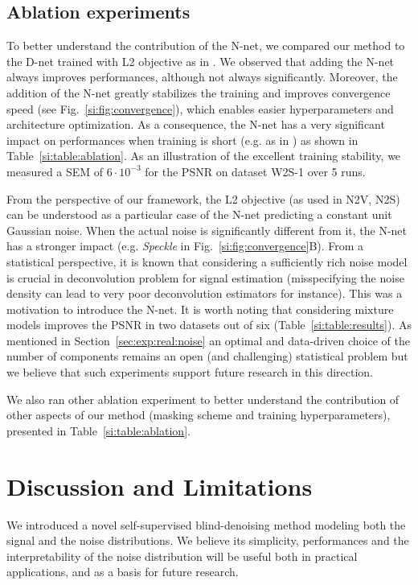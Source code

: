 \documentclass{article}
\begin{document}
\subsection{Ablation experiments}
To better understand the contribution of the N-net, we compared our method to the D-net trained with L2 objective as in \cite{batson2019noise2self, krull2018noise2void, goncharova2020}. We observed that adding the N-net always improves performances, although not always significantly.
Moreover, the addition of the N-net greatly stabilizes the training and improves convergence speed (see Fig.~\ref{si:fig:convergence}), which enables easier hyperparameters and architecture optimization.
As a consequence, the N-net has a very significant impact on performances when training is short (e.g. as in \cite{krull2018noise2void, goncharova2020}) as shown in Table~\ref{si:table:ablation}.
As an illustration of the excellent training stability, we measured a SEM of $6\cdot10^{-3}$ for the PSNR on dataset W2S-1 over 5 runs.

From the perspective of our framework, the L2 objective (as used in N2V, N2S) can be understood as a particular case of the N-net predicting a constant unit Gaussian noise. When the actual noise is significantly different from it, the N-net has a stronger impact (e.g. \textit{Speckle} in Fig.~\ref{si:fig:convergence}B).
From a statistical perspective, it is known that considering a sufficiently rich noise model is crucial in deconvolution problem for signal estimation (misspecifying the noise density can lead to very poor deconvolution estimators for instance). This was a motivation to introduce the N-net.
It is worth noting that considering mixture models improves the PSNR in two datasets out of six (Table~\ref{si:table:results}).
As mentioned in Section~\ref{sec:exp:real:noise} an optimal and data-driven choice of the number of components remains an open (and challenging) statistical problem but we believe that such experiments support future research in this direction.

We also ran other ablation experiment to better understand the contribution of other aspects of our method (masking scheme and training hyperparameters), presented in Table~\ref{si:table:ablation}.

\section{Discussion and Limitations}
\label{sec:discussion}
We introduced a novel self-supervised blind-denoising method modeling both the signal and the noise distributions. We believe its simplicity, performances and the interpretability of the noise distribution will be useful both in practical applications, and as a basis for future research.
\end{document}
